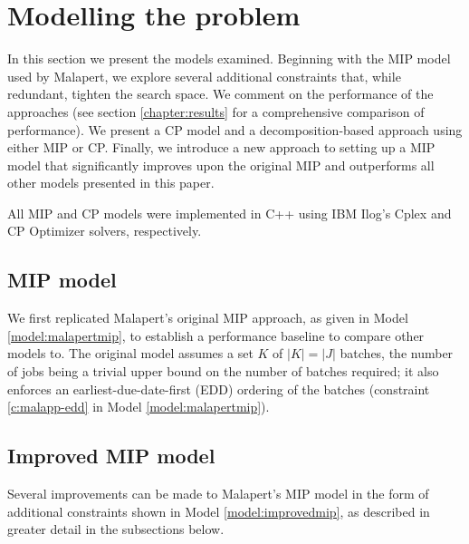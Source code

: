 \documentclass[13pt, letterpaper, oneside]{book}
\begin{document}

\chapter{Modelling the problem} 
In this section we present the models examined.
Beginning with the MIP model used by Malapert, we explore several additional
constraints that, while redundant, tighten the search space. We comment on the
performance of the approaches (see section \ref{chapter:results} for a
comprehensive comparison of performance). We present a CP model and a
decomposition-based approach using either MIP or CP. Finally, we introduce a new
approach to setting up a MIP model that significantly improves upon the original
MIP and outperforms all other models presented in this paper.

All MIP and CP models were implemented in C++ using IBM Ilog's Cplex and CP
Optimizer solvers, respectively.

\section{MIP model}\label{sec:malapertmipmodel}
We first replicated Malapert's original MIP approach, as given in Model
\ref{model:malapertmip}, to establish a performance baseline to compare other
models to. The original model assumes a
set $K$ of $|K| = |J|$ batches, the number of jobs being a trivial upper bound
on the number of batches required; it also enforces an earliest-due-date-first
(EDD) ordering of the batches (constraint \eqref{c:malapp-edd} in Model
\ref{model:malapertmip}).

\section{Improved MIP model}\label{sec:improvedmipmodel}
Several improvements can be made to Malapert's MIP model in the form of
additional constraints shown in Model \ref{model:improvedmip}, as  
described in greater detail in the subsections below.
\end{document}
